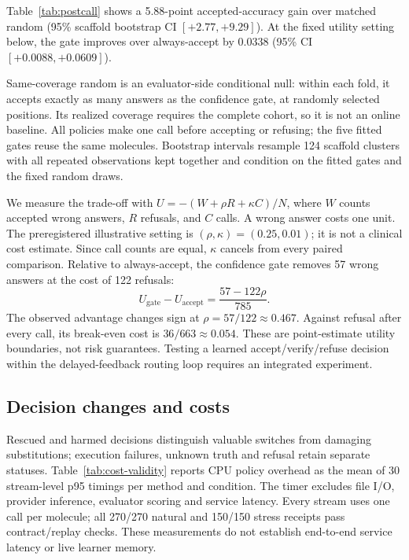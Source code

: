 \documentclass[sigconf,anonymous]{aamas}
\begin{document}
Table~\ref{tab:postcall} shows a 5.88-point accepted-accuracy gain over matched random (95\% scaffold bootstrap CI $[+2.77,+9.29]$). At the fixed utility setting below, the gate improves over always-accept by 0.0338 (95\% CI $[+0.0088,+0.0609]$).

Same-coverage random is an evaluator-side conditional null: within each fold, it accepts exactly as many answers as the confidence gate, at randomly selected positions. Its realized coverage requires the complete cohort, so it is not an online baseline. All policies make one call before accepting or refusing; the five fitted gates reuse the same molecules. Bootstrap intervals resample 124 scaffold clusters with all repeated observations kept together and condition on the fitted gates and the fixed random draws.

We measure the trade-off with $U=-(W+\rho R+\kappa C)/N$, where $W$ counts accepted wrong answers, $R$ refusals, and $C$ calls. A wrong answer costs one unit. The preregistered illustrative setting is $(\rho,\kappa)=(0.25,0.01)$; it is not a clinical cost estimate. Since call counts are equal, $\kappa$ cancels from every paired comparison. Relative to always-accept, the confidence gate removes 57 wrong answers at the cost of 122 refusals:
\begin{equation}
 U_{\mathrm{gate}}-U_{\mathrm{accept}}=\frac{57-122\rho}{785}.
\end{equation}
The observed advantage changes sign at $\rho=57/122\approx0.467$. Against refusal after every call, its break-even cost is $36/663\approx0.054$. These are point-estimate utility boundaries, not risk guarantees. Testing a learned accept/verify/refuse decision within the delayed-feedback routing loop requires an integrated experiment.

\subsection{Decision changes and costs}
Rescued and harmed decisions distinguish valuable switches from damaging substitutions; execution failures, unknown truth and refusal retain separate statuses. Table~\ref{tab:cost-validity} reports CPU policy overhead as the mean of 30 stream-level p95 timings per method and condition. The timer excludes file I/O, provider inference, evaluator scoring and service latency. Every stream uses one call per molecule; all 270/270 natural and 150/150 stress receipts pass contract/replay checks. These measurements do not establish end-to-end service latency or live learner memory.
\end{document}
